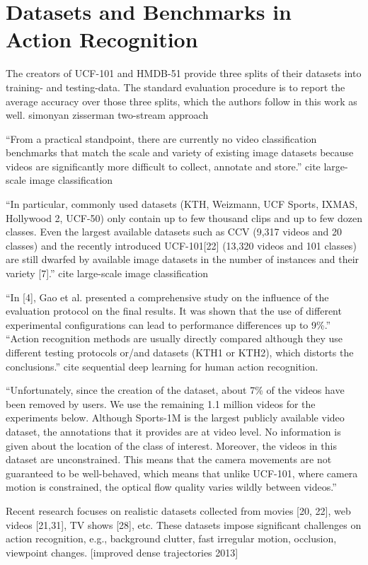 \section{Datasets and Benchmarks in Action Recognition}
\label{chap:datasets}

The creators of UCF-101 and HMDB-51 provide three splits of their datasets into training- and testing-data.
The standard evaluation procedure is to report the average accuracy over those three splits, which the authors follow in this work as well.
simonyan zisserman two-stream approach

``From a practical standpoint, there are currently no video classification benchmarks that match the scale and variety of existing image datasets because videos are significantly more difficult to collect, annotate and store.'' cite large-scale image classification

``In particular, commonly used datasets (KTH, Weizmann, UCF Sports, IXMAS, Hollywood 2, UCF-50) only contain up to few thousand clips and up to few dozen classes.
Even the largest available datasets such as CCV (9,317 videos and 20 classes) and the recently introduced UCF-101[22] (13,320 videos and 101 classes) are still dwarfed by available image datasets in the number of instances and their variety [7].'' cite large-scale image classification

``In [4], Gao et al. presented a comprehensive study on the influence of the evaluation protocol on the final results. It was shown that the use of different experimental configurations can lead to performance differences up to 9\%.''
``Action recognition methods are usually directly compared although they use different testing protocols or/and datasets (KTH1 or KTH2), which distorts the conclusions.''
cite sequential deep learning for human action recognition.

``Unfortunately,
since the creation of the dataset, about 7\% of the videos have been removed by users. We use the remaining 1.1 million videos for the experiments below.
Although Sports-1M is the largest publicly available video dataset, the annotations that it provides are at video level.
No information is given about the location of the class of interest.
Moreover, the videos in this dataset are unconstrained.
This means that the camera movements are not guaranteed to be well-behaved, which means that unlike UCF-101, where camera motion is constrained, the optical flow quality varies wildly between videos.''

Recent research focuses on realistic datasets collected from movies [20, 22], web videos [21,31], TV shows [28], etc. These datasets impose significant challenges on action recognition, e.g., background clutter, fast irregular motion, occlusion, viewpoint changes. [improved dense trajectories 2013]

